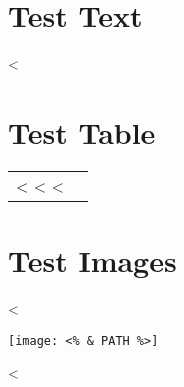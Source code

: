 \documentclass[a4paper,landscape]{article}
\begin{document}
\section{Test Text}

<%

\section{Test Table}


\begin{tabular}{|l|l|}
\hline
<%
<%
\hline
<%
\end{tabular}

\section{Test Images}

<%
\begin{center}
\texttt{[image: <\% \& PATH \%>]}
\end{center}
<%
\end{document}
